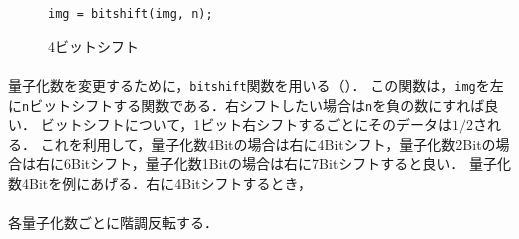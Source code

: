 \begin{wrapfigure}{r}[0mm]{.3\textwidth}
    \centering
    \vspace{-.5cm}
    \begin{lstlisting}[caption={\texttt{bitshift}関数},label={src:bitshift}]
img = bitshift(img, n);
    \end{lstlisting}
    \vspace{1cm}
    \caption{4ビットシフト}
    \label{fig:4ビットシフト}
    \vspace{-.5cm}
\end{wrapfigure}
\paragraph{\kadaiab}
量子化数を変更するために，\texttt{bitshift}関数を用いる（）．
この関数は，\texttt{img}を左に\texttt{n}ビットシフトする関数である．右シフトしたい場合は\texttt{n}を負の数にすれば良い．
ビットシフトについて，1ビット右シフトするごとにそのデータは\(1/2\)される．
これを利用して，量子化数4Bitの場合は右に4Bitシフト，量子化数2Bitの場合は右に6Bitシフト，量子化数1Bitの場合は右に7Bitシフトすると良い．
量子化数4Bitを例にあげる．右に4Bitシフトするとき，
\paragraph{\kadaiac}各量子化数ごとに階調反転する．